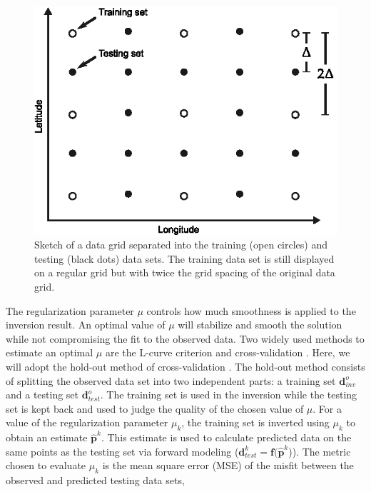 \documentclass[extra,mreferee]{gji}
\begin{document}
\begin{figure}
    \centering
    \includegraphics{figures/cv-grid-separation}
    \caption{Sketch of a data grid separated into
        the training (open circles)
        and testing (black dots) data sets.
        The training data set is still displayed on a regular grid
        but with twice the grid spacing
        of the original data grid.}
    \label{fig:grid_separation}
\end{figure}

The regularization parameter $\mu$ controls how much smoothness is applied to
the inversion result.
An optimal value of $\mu$ will stabilize and smooth the solution while not
compromising the fit to the observed data.
Two widely used methods to estimate an optimal $\mu$ are
the L-curve criterion and cross-validation \citep{hansen1992}.
Here, we will adopt the hold-out method of cross-validation \citep{kim2009}.
The hold-out method consists of splitting the observed data set into two
independent parts:
a training set $\mathbf{d}^o_{inv}$
and a testing set $\mathbf{d}^o_{test}$.
The training set is used in the inversion
while the testing set is kept back
and used to judge the quality of the chosen value of $\mu$.
For a value of the regularization parameter $\mu_k$,
the training set is inverted using $\mu_k$
to obtain an estimate $\mathbf{\hat{p}}^k$.
This estimate is used to calculate predicted data
on the same points as the testing set
via forward modeling
($\mathbf{d}_{test}^k = \mathbf{f}(\mathbf{\hat{p}}^k$)).
The metric chosen to evaluate $\mu_k$ is
the mean square error (MSE) of the misfit
between the observed and predicted testing data sets,
\end{document}
